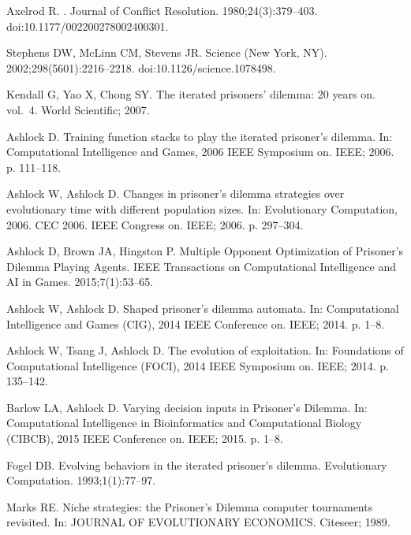 \documentclass[10pt,letterpaper]{article}
\begin{document}
\begin{thebibliography}{10}
Axelrod R.
.
\newblock Journal of Conflict Resolution. 1980;24(3):379--403.
\newblock doi:{10.1177/002200278002400301}.

Stephens DW, McLinn CM, Stevens JR.
\newblock Science (New York, NY). 2002;298(5601):2216--2218.
\newblock doi:{10.1126/science.1078498}.

Kendall G, Yao X, Chong SY.
\newblock The iterated prisoners' dilemma: 20 years on. vol.~4.
\newblock World Scientific; 2007.

Ashlock D.
\newblock Training function stacks to play the iterated prisoner's dilemma.
\newblock In: Computational Intelligence and Games, 2006 IEEE Symposium on.
  IEEE; 2006. p. 111--118.

Ashlock W, Ashlock D.
\newblock Changes in prisoner’s dilemma strategies over evolutionary time
  with different population sizes.
\newblock In: Evolutionary Computation, 2006. CEC 2006. IEEE Congress on. IEEE;
  2006. p. 297--304.

Ashlock D, Brown JA, Hingston P.
\newblock Multiple Opponent Optimization of Prisoner’s Dilemma Playing
  Agents.
\newblock IEEE Transactions on Computational Intelligence and AI in Games.
  2015;7(1):53--65.

Ashlock W, Ashlock D.
\newblock Shaped prisoner's dilemma automata.
\newblock In: Computational Intelligence and Games (CIG), 2014 IEEE Conference
  on. IEEE; 2014. p. 1--8.

Ashlock W, Tsang J, Ashlock D.
\newblock The evolution of exploitation.
\newblock In: Foundations of Computational Intelligence (FOCI), 2014 IEEE
  Symposium on. IEEE; 2014. p. 135--142.

Barlow LA, Ashlock D.
\newblock Varying decision inputs in Prisoner's Dilemma.
\newblock In: Computational Intelligence in Bioinformatics and Computational
  Biology (CIBCB), 2015 IEEE Conference on. IEEE; 2015. p. 1--8.

Fogel DB.
\newblock Evolving behaviors in the iterated prisoner's dilemma.
\newblock Evolutionary Computation. 1993;1(1):77--97.

Marks RE.
\newblock Niche strategies: the Prisoner’s Dilemma computer tournaments
  revisited.
\newblock In: JOURNAL OF EVOLUTIONARY ECONOMICS. Citeseer; 1989.


\end{thebibliography}
\end{document}
